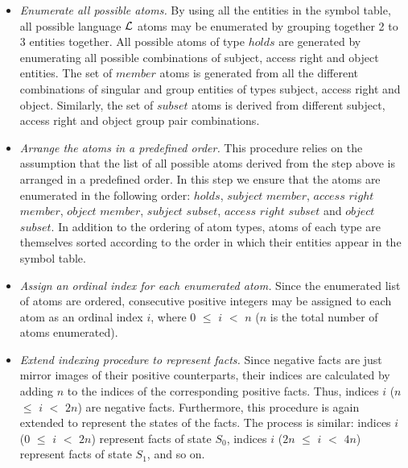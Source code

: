 \documentclass[global,twocolumn,final]{svjour}
\begin{document}
          \begin{itemize}

            \item
              {\em Enumerate all possible atoms.}
              By using all the entities in the symbol table, all possible
              language ${\cal L}$ atoms may be enumerated by grouping together
              2 to 3 entities together. All possible atoms of type $holds$ are
              generated by enumerating all possible combinations of subject,
              access right and object entities. The set of $member$ atoms is
              generated from all the different combinations of singular and
              group entities of types subject, access right and object.
              Similarly, the set of $subset$ atoms is derived from different
              subject, access right and object group pair combinations.

            \item
              {\em Arrange the atoms in a predefined order.}
              This procedure relies on the assumption that the list of all
              possible atoms derived from the step above is arranged in a
              predefined order. In this step we ensure that the atoms are
              enumerated in the following order: $holds$, $subject$ $member$,
              $access$ $right$ $member$, $object$ $member$, $subject$
              $subset$, $access$ $right$ $subset$ and $object$ $subset$. In
              addition to the ordering of atom types, atoms of each type are
              themselves sorted according to the order in which their entities
              appear in the symbol table.

            \item
              {\em Assign an ordinal index for each enumerated atom.}
              Since the enumerated list of atoms are ordered, consecutive
              positive integers may be assigned to each atom as an ordinal
              index $i$, where $0$ $\leq$ $i$ $<$ $n$ ($n$ is the total
              number of atoms enumerated).

            \item
              {\em Extend indexing procedure to represent facts.} Since
              negative facts are just mirror images of their positive
              counterparts, their indices are calculated by adding $n$ to the
              indices of the corresponding positive facts. Thus, indices $i$
              ($n$ $\leq$ $i$ $<$ $2n$) are negative facts. Furthermore, this
              procedure is again extended to represent the states of the
              facts. The process is similar: indices $i$ ($0$ $\leq$ $i$ $<$
              $2n$) represent facts of state $S_{0}$, indices $i$ ($2n$ $\leq$
              $i$ $<$ $4n$) represent facts of state $S_{1}$, and so on.
          \end{itemize}
\end{document}
